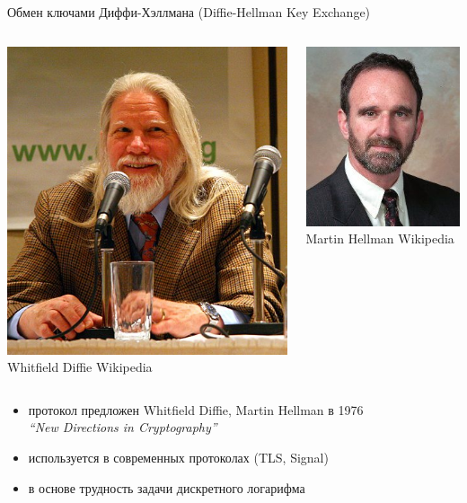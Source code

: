 \documentclass[usenames,dvipsnames,8pt,aspectratio=169]{beamer}
\begin{document}
\begin{frame}{Обмен ключами Диффи-Хэллмана (Diffie-Hellman Key Exchange)}
\centering
\begin{columns}
	\begin{column}{0.5\textwidth}
		\includegraphics[width=0.65\linewidth]{Whit_Diffie}\\
		Whitfield Diffie  \textcopyright Wikipedia
	\end{column}
	\begin{column}{0.5\textwidth}
	\includegraphics[width=0.6\linewidth]{Martin-Hellman}\\
	Martin Hellman  	\small \textcopyright Wikipedia
\end{column}
\end{columns}
\vspace{15pt}
\large
	\begin{itemize}
		\item протокол предложен  Whitfield Diffie, Martin Hellman в 1976 \\
		\textit{``New Directions in Cryptography''}
		\item используется в современных протоколах (TLS, Signal)
		\item в основе  трудность {\color{Orange} задачи дискретного логарифма}
	\end{itemize}
\end{frame}
\end{document}
